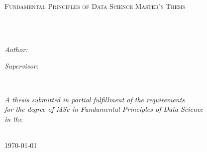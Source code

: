 \documentclass[
11pt, %
english, %
onehalfspacing, %
headsepline, %
]{MastersDoctoralThesis} %
\author{Zoltan Kunos} %
\begin{document}
\frontmatter %

\pagestyle{plain} %


\begin{titlepage}
\begin{center}

\vspace*{0.06\textheight}
{\scshape\LARGE \univname\par}\vspace{1.5cm} %
\textsc{\Large Fundamental Principles of Data Science Master's Thesis}\\[0.5cm] %

\HRule \\[0.4cm] %
{\huge \bfseries \ttitle\par}\vspace{0.4cm} %
\HRule \\[1.5cm] %

\begin{minipage}[t]{0.4\textwidth}
\begin{flushleft} \large
\emph{Author:}\\
\authorname
\end{flushleft}
\end{minipage}
\begin{minipage}[t]{0.4\textwidth}
\begin{flushright} \large
\emph{Supervisor:} \\
\supname
\end{flushright}
\end{minipage}\\[3cm]

\vfill

\large \textit{A thesis submitted in partial fulfillment of the requirements\\ for the degree of MSc in Fundamental Principles of Data Science}\\[0.3cm] %
\textit{in the}\\[0.4cm]
\facname\\[2cm] %

\vfill

{\large \today}\\[4cm] %

\vfill
\end{center}
\end{titlepage}
\end{document}
